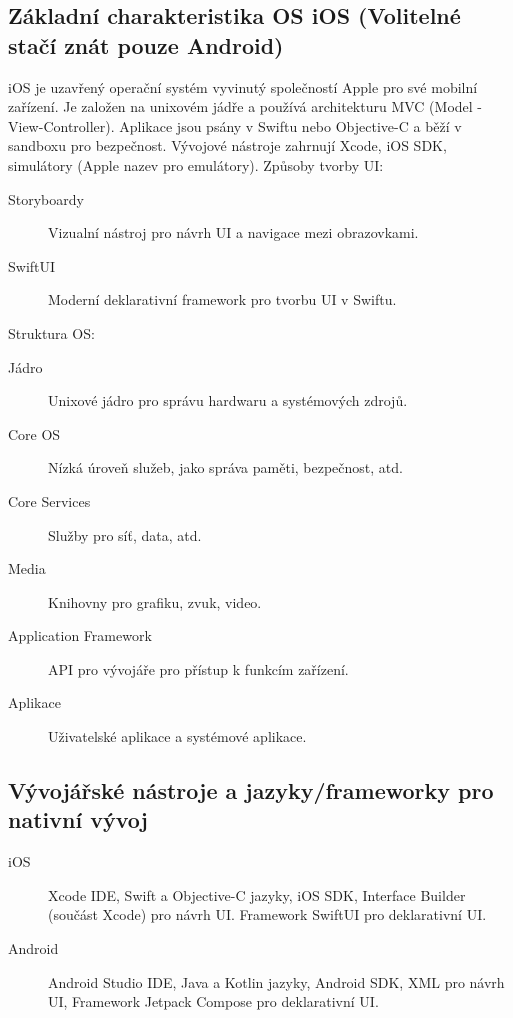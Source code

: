 \subsection{Základní charakteristika OS iOS (Volitelné stačí znát pouze Android)}
iOS je uzavřený operační systém vyvinutý společností Apple pro své mobilní zařízení.
Je založen na unixovém jádře a používá architekturu MVC (Model
-View-Controller). Aplikace jsou psány v Swiftu nebo Objective-C a běží v sandboxu 
pro bezpečnost.
Vývojové nástroje zahrnují Xcode, iOS SDK, simulátory (Apple nazev pro emulátory). Způsoby tvorby UI:
\begin{description}
    \item[Storyboardy] Vizualní nástroj pro návrh UI a navigace mezi obrazovkami.
    \item[SwiftUI] Moderní deklarativní framework pro tvorbu UI v Swiftu.
\end{description}
Struktura OS:
\begin{description}
    \item[Jádro] Unixové jádro pro správu hardwaru a systémových zdrojů.
    \item[Core OS] Nízká úroveň služeb, jako správa paměti, bezpečnost, atd.
    \item[Core Services] Služby pro síť, data, atd.
    \item[Media] Knihovny pro grafiku, zvuk, video.
    \item[Application Framework] API pro vývojáře pro přístup k funkcím zařízení.
    \item[Aplikace] Uživatelské aplikace a systémové aplikace.
\end{description}

\subsection{Vývojářské nástroje a jazyky/frameworky pro nativní vývoj}
\begin{description}
    \item[iOS] Xcode IDE, Swift a Objective-C jazyky, iOS SDK, Interface Builder (součást Xcode) pro návrh UI. Framework SwiftUI pro deklarativní UI.
    \item[Android] Android Studio IDE, Java a Kotlin jazyky, Android SDK, XML pro návrh UI, Framework Jetpack Compose pro
    deklarativní UI.
\end{description}

